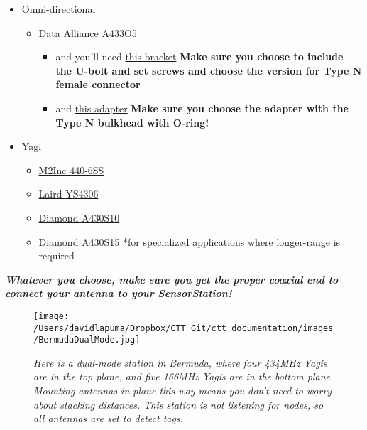 \documentclass[
]{article}
\providecommand{\tightlist}{%
  \setlength{\itemsep}{0pt}\setlength{\parskip}{0pt}}
\begin{document}
\begin{itemize}
\tightlist
\item
  Omni-directional

  \begin{itemize}
  \tightlist
  \item
    \href{https://www.data-alliance.net/antenna-433mhz-5dbi-omnidirectional-fiberglass-w-n-male-vhf-uhf-marine/}{Data
    Alliance A433O5}

    \begin{itemize}
    \tightlist
    \item
      and you'll need
      \href{https://www.data-alliance.net/l-mount-for-antenna-pole-or-wall-mount-hole-for-n-female-or-rp-sma/}{this
      bracket} \textbf{Make sure you choose to include the U-bolt and
      set screws and choose the version for Type N female connector}
    \item
      and
      \href{https://www.data-alliance.net/n-type-female-to-female-coupler-adapter-w-o-ring-weatherproof-bulkhead/}{this
      adapter} \textbf{Make sure you choose the adapter with the Type N
      bulkhead with O-ring!}
    \end{itemize}
  \end{itemize}
\item
  Yagi

  \begin{itemize}
  \tightlist
  \item
    \href{https://www.m2inc.com/FG4406SS}{M2Inc 440-6SS}
  \item
    \href{https://www.mouser.com/ProductDetail/Laird-Connectivity/YS4306?qs=EU6FO9ffTwelQ7\%2FXOHiHew\%3D\%3D}{Laird
    YS4306}
  \item
    \href{https://www.hamradio.com/detail.cfm?pid=H0-005816}{Diamond
    A430S10}
  \item
    \href{https://www.dxengineering.com/parts/dmn-a430s15}{Diamond
    A430S15} *for specialized applications where longer-range is
    required
  \end{itemize}
\end{itemize}

\emph{\textbf{Whatever you choose, make sure you get the proper coaxial
end to connect your antenna to your SensorStation!}}

\begin{figure}
\hypertarget{id}{%
\centering
\texttt{[image: /Users/davidlapuma/Dropbox/CTT\_Git/ctt\_documentation/images/BermudaDualMode.jpg]}
\caption{\emph{Here is a dual-mode station in Bermuda, where four 434MHz
Yagis are in the top plane, and five 166MHz Yagis are in the bottom
plane. Mounting antennas in plane this way means you don't need to worry
about stacking distances. This station is not listening for nodes, so
all antennas are set to detect tags.}}\label{id}
}
\end{figure}
\end{document}
